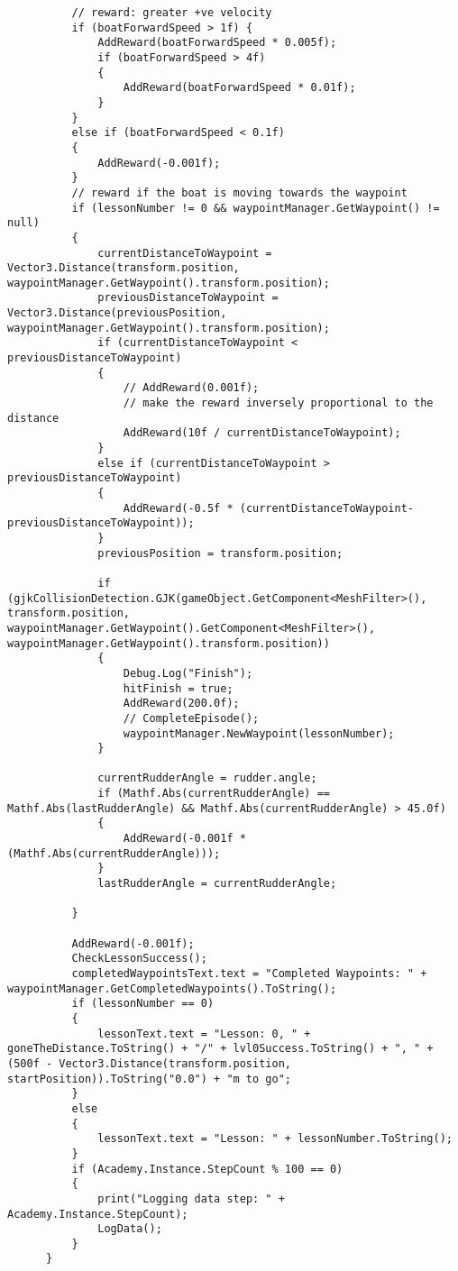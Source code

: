 \begin{lstlisting}
          // reward: greater +ve velocity
          if (boatForwardSpeed > 1f) {
              AddReward(boatForwardSpeed * 0.005f);
              if (boatForwardSpeed > 4f)
              {
                  AddReward(boatForwardSpeed * 0.01f);
              }
          }
          else if (boatForwardSpeed < 0.1f)
          {
              AddReward(-0.001f);
          }
          // reward if the boat is moving towards the waypoint
          if (lessonNumber != 0 && waypointManager.GetWaypoint() != null)
          {
              currentDistanceToWaypoint = Vector3.Distance(transform.position, waypointManager.GetWaypoint().transform.position);
              previousDistanceToWaypoint = Vector3.Distance(previousPosition, waypointManager.GetWaypoint().transform.position);        
              if (currentDistanceToWaypoint < previousDistanceToWaypoint)
              {
                  // AddReward(0.001f);
                  // make the reward inversely proportional to the distance
                  AddReward(10f / currentDistanceToWaypoint);
              }
              else if (currentDistanceToWaypoint > previousDistanceToWaypoint)
              {
                  AddReward(-0.5f * (currentDistanceToWaypoint- previousDistanceToWaypoint));
              }
              previousPosition = transform.position;
  
              if (gjkCollisionDetection.GJK(gameObject.GetComponent<MeshFilter>(), transform.position, waypointManager.GetWaypoint().GetComponent<MeshFilter>(), waypointManager.GetWaypoint().transform.position))
              {
                  Debug.Log("Finish");
                  hitFinish = true;
                  AddReward(200.0f);
                  // CompleteEpisode();
                  waypointManager.NewWaypoint(lessonNumber);
              }
  
              currentRudderAngle = rudder.angle;
              if (Mathf.Abs(currentRudderAngle) == Mathf.Abs(lastRudderAngle) && Mathf.Abs(currentRudderAngle) > 45.0f)
              {
                  AddReward(-0.001f * (Mathf.Abs(currentRudderAngle)));
              }
              lastRudderAngle = currentRudderAngle;
              
          }
  
          AddReward(-0.001f);
          CheckLessonSuccess();
          completedWaypointsText.text = "Completed Waypoints: " + waypointManager.GetCompletedWaypoints().ToString();
          if (lessonNumber == 0)
          {
              lessonText.text = "Lesson: 0, " + goneTheDistance.ToString() + "/" + lvl0Success.ToString() + ", " + (500f - Vector3.Distance(transform.position, startPosition)).ToString("0.0") + "m to go";
          }
          else 
          {
              lessonText.text = "Lesson: " + lessonNumber.ToString();
          }
          if (Academy.Instance.StepCount % 100 == 0)
          {
              print("Logging data step: " + Academy.Instance.StepCount);
              LogData();
          }
      }
  

\end{lstlisting}
